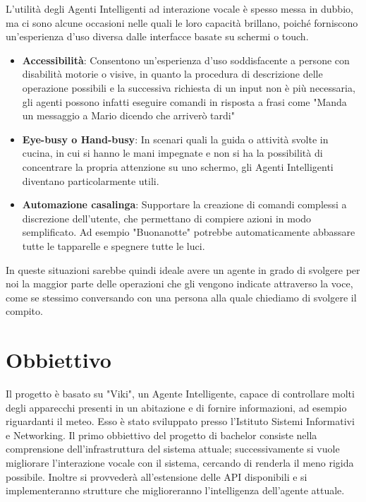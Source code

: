 \documentclass[twoside]{supsistudent}
\begin{document}
L'utilità degli Agenti Intelligenti ad interazione vocale è spesso messa in dubbio, ma ci sono alcune occasioni nelle quali le loro capacità brillano, poiché forniscono un'esperienza d'uso diversa dalle interfacce basate su schermi o touch.
\begin{itemize}
	\item \textbf{Accessibilità}: Consentono un'esperienza d'uso soddisfacente a persone con disabilità motorie o visive, in quanto la procedura di descrizione delle operazione possibili e la successiva richiesta di un input non è più necessaria, gli agenti possono infatti eseguire comandi in risposta a frasi come "Manda un messaggio a Mario dicendo che arriverò tardi"
	\item \textbf{Eye-busy o Hand-busy}: In scenari quali la guida o attività svolte in cucina, in cui si hanno le mani impegnate e non si ha la possibilità di concentrare la propria attenzione su uno schermo, gli Agenti Intelligenti diventano particolarmente utili.
	\item \textbf{Automazione casalinga}: Supportare la creazione di comandi complessi a discrezione dell'utente, che permettano di compiere azioni in modo semplificato. Ad esempio "Buonanotte" potrebbe automaticamente abbassare tutte le tapparelle e spegnere tutte le luci.
\end{itemize}
In queste situazioni sarebbe quindi ideale avere un agente in grado di svolgere per noi la maggior parte delle operazioni che gli vengono indicate attraverso la voce, come se stessimo conversando con una persona alla quale chiediamo di svolgere il compito.

\chapter{Obbiettivo}

Il progetto è basato su "Viki", un Agente Intelligente\cite{agenteinteligente}, capace di controllare molti degli apparecchi presenti in un abitazione e di fornire informazioni, ad esempio riguardanti il meteo.
Esso è stato sviluppato presso l'Istituto Sistemi Informativi e Networking. 
Il primo obbiettivo del progetto di bachelor consiste nella comprensione dell'infrastruttura del sistema attuale; successivamente si  vuole migliorare l'interazione vocale con il sistema, cercando di renderla il meno rigida possibile. Inoltre si provvederà all'estensione delle API disponibili e si implementeranno strutture che miglioreranno l'intelligenza dell'agente attuale.
\end{document}
